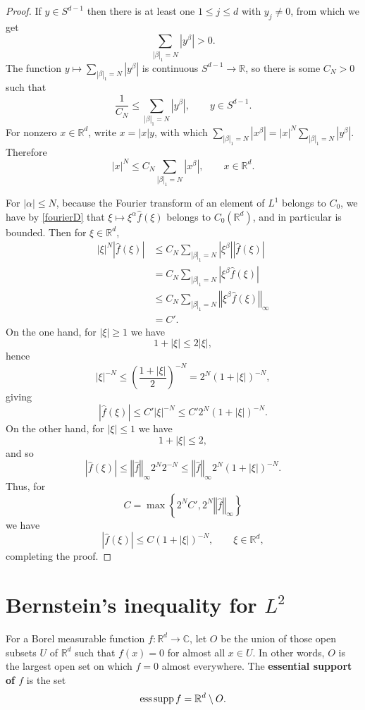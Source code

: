 \documentclass{article}
\newcommand{\ess}{\ensuremath\mathrm{ess}\,}
\newcommand{\supp}{\ensuremath\mathrm{supp}\,}
\newcommand{\norm}[1]{\left\Vert #1 \right\Vert}
\theoremstyle{definition}
\begin{document}
\begin{proof}
If $y \in S^{d-1}$ then there is at least one $1 \leq j \leq d$ with $y_j \neq 0$, from which we get
\[
\sum_{|\beta|_1 = N} |y^\beta| > 0.
\]
The function $y \mapsto \sum_{|\beta|_1 = N} |y^\beta|$ is continuous $S^{d-1} \to \mathbb{R}$, so
there is some $C_N>0$ such that
\[
\frac{1}{C_N} \leq \sum_{|\beta|_1 = N} |y^\beta|, \qquad y \in S^{d-1}.
\]
For  nonzero $x \in \mathbb{R}^d$, write $x=|x|y$, with which
$\sum_{|\beta|_1 = N} |x^\beta| = |x|^N \sum_{|\beta|_1=N} |y^\beta|$.  
Therefore
\[
|x|^N \leq C_N \sum_{|\beta|_1 = N} |x^\beta|, \qquad x \in \mathbb{R}^d.
\]

For $|\alpha| \leq N$, because the Fourier transform of an element of $L^1$ belongs
to $C_0$, we have by  \eqref{fourierD} that  $\xi \mapsto \xi^\alpha \hat{f}(\xi)$ belongs to $C_0(\mathbb{R}^d)$, and in 
particular is bounded. Then for $\xi \in \mathbb{R}^d$,
\begin{align*}
|\xi|^N |\hat{f}(\xi)|& \leq C_N \sum_{|\beta|_1 = N} |\xi^\beta| |\hat{f}(\xi)|\\
&= C_N \sum_{|\beta|_1 = N} |\xi^\beta \hat{f}(\xi)|\\
&\leq C_N \sum_{|\beta|_1 = N} \norm{\xi^\beta \hat{f}(\xi)}_\infty\\
&=C'.
\end{align*}
On the one hand,
for $|\xi| \geq 1$ we have
\[
1+|\xi| \leq 2|\xi|,
\]
hence
\[
|\xi|^{-N} \leq \left( \frac{1+|\xi|}{2} \right)^{-N}  = 2^N (1+|\xi|)^{-N},
\]
giving
\[
|\hat{f}(\xi)| \leq C' |\xi|^{-N} \leq C' 2^N (1+|\xi|)^{-N}.
\]
On the other hand, for $|\xi| \leq 1$ we have
\[
1+|\xi| \leq 2,
\]
and so
\[
|\hat{f}(\xi)| \leq \norm{\hat{f}}_\infty 2^N 2^{-N}   \leq 
  \norm{\hat{f}}_\infty 2^N (1+|\xi|)^{-N} .
\]
Thus, for
\[
C=\max\left\{2^N C', 2^N \norm{\hat{f}}_\infty\right\}
\]
we have 
\[
|\hat{f}(\xi)| \leq C(1+|\xi|)^{-N}, \qquad \xi \in \mathbb{R}^d,
\]
completing the proof.
\end{proof}




\section{Bernstein's inequality for $L^2$}
For a Borel measurable function $f:\mathbb{R}^d \to \mathbb{C}$, 
let $O$ be the union of those open subsets $U$ of $\mathbb{R}^d$ such that $f(x)=0$ for almost all
$x \in U$. In other words, $O$ is the largest open set on which $f=0$ almost everywhere.
The 
\textbf{essential support of $f$} is the set
\[
\ess \supp f = \mathbb{R}^d \setminus O.
\]
\end{document}
